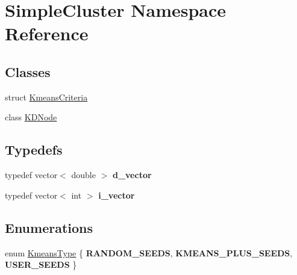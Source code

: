 \hypertarget{namespaceSimpleCluster}{\section{Simple\-Cluster Namespace Reference}
\label{namespaceSimpleCluster}
}
\subsection*{Classes}
\begin{DoxyCompactItemize}
\item 
struct \hyperlink{structSimpleCluster_1_1KmeansCriteria}{Kmeans\-Criteria}
\item 
class \hyperlink{classSimpleCluster_1_1KDNode}{K\-D\-Node}
\end{DoxyCompactItemize}
\subsection*{Typedefs}
\begin{DoxyCompactItemize}
\item 
\hypertarget{namespaceSimpleCluster_aa39bdfcecba7a15122204a678f496615}{typedef vector$<$ double $>$ {\bfseries d\-\_\-vector}}\label{namespaceSimpleCluster_aa39bdfcecba7a15122204a678f496615}

\item 
\hypertarget{namespaceSimpleCluster_a7395281cd61dde0217079787c5620e76}{typedef vector$<$ int $>$ {\bfseries i\-\_\-vector}}\label{namespaceSimpleCluster_a7395281cd61dde0217079787c5620e76}

\end{DoxyCompactItemize}
\subsection*{Enumerations}
\begin{DoxyCompactItemize}
\item 
enum \hyperlink{namespaceSimpleCluster_a8a8f57121b69a7b43575e4d6a53928e2}{Kmeans\-Type} \{ {\bfseries R\-A\-N\-D\-O\-M\-\_\-\-S\-E\-E\-D\-S}, 
{\bfseries K\-M\-E\-A\-N\-S\-\_\-\-P\-L\-U\-S\-\_\-\-S\-E\-E\-D\-S}, 
{\bfseries U\-S\-E\-R\-\_\-\-S\-E\-E\-D\-S}
 \}
\end{DoxyCompactItemize}
